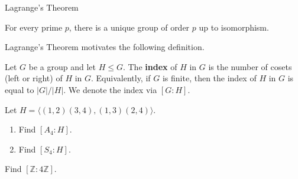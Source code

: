\begin{section}{Lagrange's Theorem}
\begin{corollary}
For every prime $p$, there is a unique group of order $p$ up to isomorphism.
\end{corollary}

Lagrange's Theorem motivates the following definition.

\begin{definition}
Let $G$ be a group and let $H\leq G$.  The \textbf{index} of $H$ in $G$ is the number of cosets (left or right) of $H$ in $G$. Equivalently, if $G$ is finite, then the index of $H$ in $G$ is equal to $|G|/|H|$.  We denote the index via $[G:H]$.
\end{definition}

\begin{problem}
Let $H=\langle (1,2)(3,4),(1,3)(2,4)\rangle$.
\begin{enumerate}[label=\textrm{(\alph*)}]
\item Find $[A_4:H]$.
\item Find $[S_4:H]$.
\end{enumerate}
\end{problem}

\begin{problem}
Find $[\mathbb{Z}:4\mathbb{Z}]$.
\end{problem}

\end{section}

